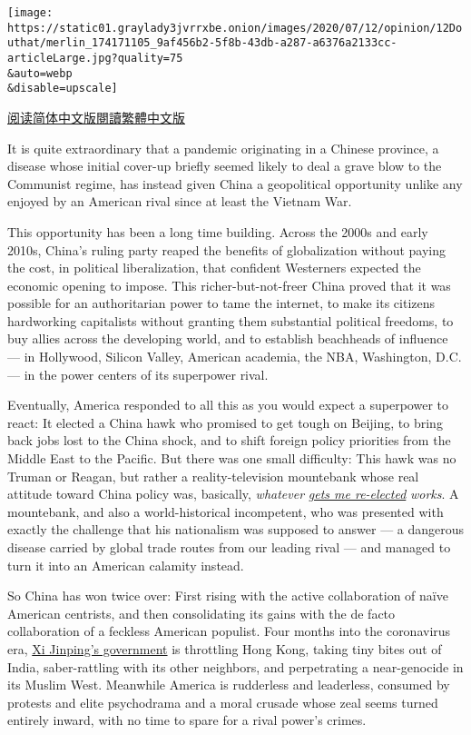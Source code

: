 \texttt{[image: https://static01.graylady3jvrrxbe.onion/images/2020/07/12/opinion/12Douthat/merlin\_174171105\_9af456b2-5f8b-43db-a287-a6376a2133cc-articleLarge.jpg?quality=75\\\&auto=webp\\\&disable=upscale]}

\href{https://cn.nytimes3xbfgragh.onion/opinion/20200713/china-coronavirus-power/}{阅读简体中文版}\href{https://cn.nytimes3xbfgragh.onion/opinion/20200713/china-coronavirus-power/zh-hant/}{閱讀繁體中文版}

It is quite extraordinary that a pandemic originating in a Chinese
province, a disease whose initial cover-up briefly seemed likely to deal
a grave blow to the Communist regime, has instead given China a
geopolitical opportunity unlike any enjoyed by an American rival since
at least the Vietnam War.

This opportunity has been a long time building. Across the 2000s and
early 2010s, China's ruling party reaped the benefits of globalization
without paying the cost, in political liberalization, that confident
Westerners expected the economic opening to impose. This
richer-but-not-freer China proved that it was possible for an
authoritarian power to tame the internet, to make its citizens
hardworking capitalists without granting them substantial political
freedoms, to buy allies across the developing world, and to establish
beachheads of influence --- in Hollywood, Silicon Valley, American
academia, the NBA, Washington, D.C. --- in the power centers of its
superpower rival.

Eventually, America responded to all this as you would expect a
superpower to react: It elected a China hawk who promised to get tough
on Beijing, to bring back jobs lost to the China shock, and to shift
foreign policy priorities from the Middle East to the Pacific. But there
was one small difficulty: This hawk was no Truman or Reagan, but rather
a reality-television mountebank whose real attitude toward China policy
was, basically, \emph{whatever}
\href{https://www.wsj.com/articles/john-bolton-the-scandal-of-trumps-china-policy-11592419564}{\emph{gets
me re-elected}} \emph{works}. A mountebank, and also a world-historical
incompetent, who was presented with exactly the challenge that his
nationalism was supposed to answer --- a dangerous disease carried by
global trade routes from our leading rival --- and managed to turn it
into an American calamity instead.

So China has won twice over: First rising with the active collaboration
of naïve American centrists, and then consolidating its gains with the
de facto collaboration of a feckless American populist. Four months into
the coronavirus era,
\href{https://www.ft.com/content/a0eac4d1-625d-4073-9eee-dcf1bacb749e}{Xi
Jinping's government} is throttling Hong Kong, taking tiny bites out of
India, saber-rattling with its other neighbors, and perpetrating a
near-genocide in its Muslim West. Meanwhile America is rudderless and
leaderless, consumed by protests and elite psychodrama and a moral
crusade whose zeal seems turned entirely inward, with no time to spare
for a rival power's crimes.


